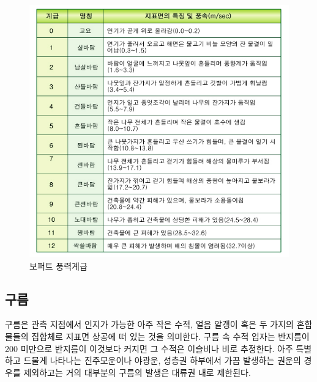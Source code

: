 \begin{figure}[h!]
	\centering
	\includegraphics[width=0.9\linewidth]{21observing/images/11120_1_2}
	\caption{보퍼트 풍력계급}
	\label{fig:1112012}
\end{figure}


\subsection{구름}

구름은 관측 지점에서 인지가 가능한 아주 작은 수적, 얼음 알갱이 혹은 두 가지의 혼합물들의 집합체로 지표면 상공에 떠 있는 것을 의미한다. 구름 속 수적 입자는 반지름이 200 미만으로 반지름이 이것보다 커지면 그 수적은 이슬비나 비로 추정한다. 아주 특별하고 드물게 나타나는 진주모운이나 야광운, 성층권 하부에서 가끔 발생하는 권운의 경우를 제외하고는 거의
대부분의 구름의 발생은 대류권 내로 제한된다. 

